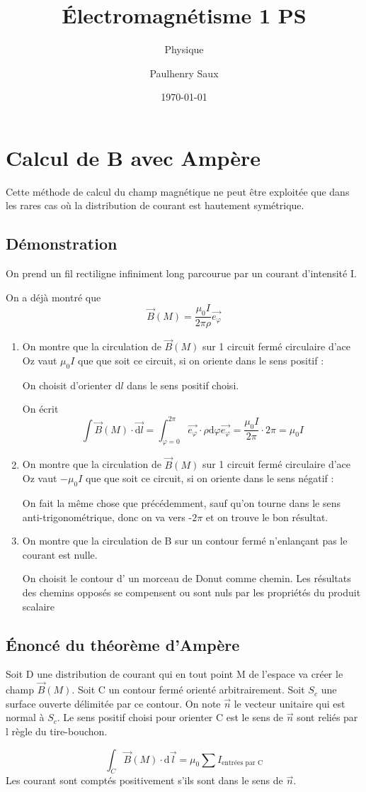 \documentclass[french]{yLectureNote}
\title{Électromagnétisme 1 PS}
\subtitle{Physique}
\author{Paulhenry Saux}
\date{\today}
\renewcommand{\vec}{\overrightarrow}
\newcommand{\dd}{\mathrm{d}}
\newcommand{\B}{\vec{B}(M)}
\newcommand{\ep}{\vec{e_{\varphi}}}
\begin{document}
\setcounter{chapter}{7}
\chapter{Calcul de B avec Ampère}
Cette méthode de calcul du champ magnétique ne peut \^etre exploitée que dans les rares cas où la distribution de courant est hautement symétrique.
\section{Démonstration}
On prend un fil rectiligne infiniment long parcourue par un courant d'intensité I.

On a déjà montré que \[\B = \frac{\mu_0 I}{2\pi\rho}\ep\]

\begin{enumerate}
 \item On montre que la circulation  de \(\B\) sur 1 circuit fermé circulaire d'ace Oz vaut \(\mu_0I\) que que soit ce circuit, si on oriente dans le sens positif :

 On choisit d'orienter \(\dd l\) dans le sens positif choisi.

 On écrit \[\int \B \cdot  \vec{\dd l} = \int_{\varphi = 0}^{2\pi} \ep \cdot \rho \dd \varphi \ep = \frac{\mu_0I}{2\pi}\cdot 2\pi = \mu_0I \]

 \item On montre que la circulation  de \(\B\) sur 1 circuit fermé circulaire d'ace Oz vaut \(-\mu_0I\) que que soit ce circuit, si on oriente dans le sens négatif :

 On fait la m\^eme chose que précédemment, sauf qu'on tourne dans le sens anti-trigonométrique, donc on va vers -\(2\pi\) et on trouve le bon résultat.

 \item On montre que la circulation de B sur un contour fermé n'enlançant pas le courant est nulle.

 On choisit le contour d' un morceau de Donut comme chemin. Les résultats des chemins opposés se compensent ou sont nuls par les propriétés du produit scalaire
\end{enumerate}
\section{Énoncé du théorème d'Ampère}
 Soit D une distribution de courant qui en tout point M de l'espace va créer le champ \(\B\). Soit C un contour fermé orienté arbitrairement. Soit \(S_c\) une surface ouverte délimitée par ce contour. On note \(\vec{n}\) le vecteur unitaire qui est normal à \(S_c\). Le sens positif choisi pour orienter C est le sens de \(\vec{n}\) sont reliés par l règle du tire-bouchon.
\begin{theorem}
\[\int_C \vec{B}(M)\cdot \dd \vec{l} = \mu_0 \sum I_{\text{entrées par C}} \]
Les courant sont comptés positivement s'ils sont dans le sens de \(\vec{n}\).
\end{theorem}
\end{document}
